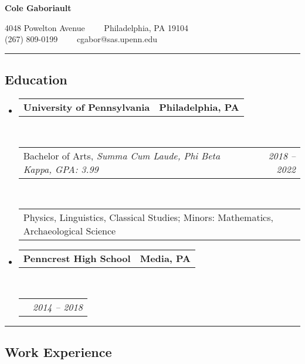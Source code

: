 \documentclass[11pt,letterpaper]{article}
\makeatletter
\newcommand{\headerrow}[2]
{\begin{tabular*}{\linewidth}{l@{\extracolsep{\fill}}r}
	#1 &
	#2 \\
\end{tabular*}}
\makeatother
\begin{document}
\begin{center}
{\LARGE \bfseries Cole Gaboriault}

4048 Powelton Avenue\ \ \textbullet
\ \ Philadelphia, PA 19104
\\
(267) 809-0199\ \ \textbullet
\ \ cgabor@sas.upenn.edu
\end{center}


\hrule
\vspace{-0.4em}
\subsection*{Education}

\begin{itemize}
	\parskip=0.1em

	\item
	\headerrow
		{\bfseries University of Pennsylvania}
		{\bfseries Philadelphia, PA}
	\\
	\headerrow
		{Bachelor of Arts, \em Summa Cum Laude, Phi Beta Kappa, GPA: 3.99}
		{\em 2018 -- 2022}
	\\
	\headerrow
		{Physics, Linguistics, Classical Studies; Minors: Mathematics, Archaeological Science}{}

	\item
	\headerrow
		{\bfseries Penncrest High School}
		{\bfseries Media, PA}
	\\
	\headerrow
		{}
		{\em 2014 -- 2018}

\end{itemize}

\hrule
\vspace{-0.4em}
\subsection*{Work Experience}
\end{document}
